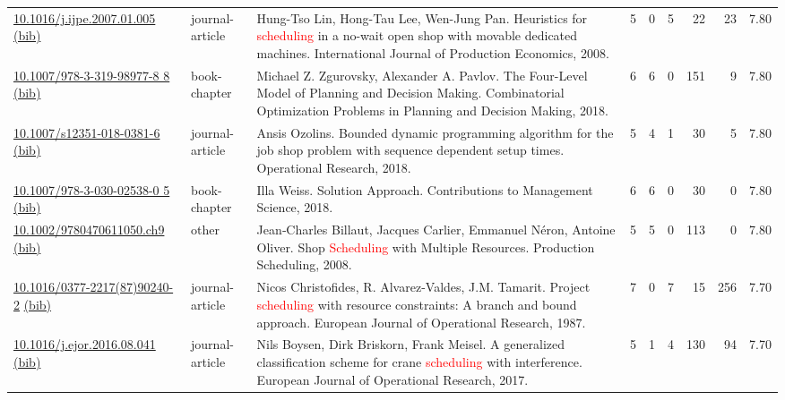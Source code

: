{\begin{longtable}{p{5cm}lp{11cm}rrrrrr}
\href{http://dx.doi.org/10.1016/j.ijpe.2007.01.005}{10.1016/j.ijpe.2007.01.005} \href{https://www.doi2bib.org/bib/10.1016/j.ijpe.2007.01.005}{(bib)} & journal-article & Hung-Tso Lin, Hong-Tau Lee, Wen-Jung Pan. Heuristics for \textcolor{red}{scheduling} in a no-wait open shop with movable dedicated machines. International Journal of Production Economics, 2008. & 5 & 0 & 5 & 22 & 23 &  7.80\\
\href{http://dx.doi.org/10.1007/978-3-319-98977-8_8}{10.1007/978-3-319-98977-8 8} \href{https://www.doi2bib.org/bib/10.1007/978-3-319-98977-8_8}{(bib)} & book-chapter & Michael Z. Zgurovsky, Alexander A. Pavlov. The Four-Level Model of Planning and Decision Making. Combinatorial Optimization Problems in Planning and Decision Making, 2018. & 6 & 6 & 0 & 151 & 9 &  7.80\\
\href{http://dx.doi.org/10.1007/s12351-018-0381-6}{10.1007/s12351-018-0381-6} \href{https://www.doi2bib.org/bib/10.1007/s12351-018-0381-6}{(bib)} & journal-article & Ansis Ozolins. Bounded dynamic programming algorithm for the job shop problem with sequence dependent setup times. Operational Research, 2018. & 5 & 4 & 1 & 30 & 5 &  7.80\\
\href{http://dx.doi.org/10.1007/978-3-030-02538-0_5}{10.1007/978-3-030-02538-0 5} \href{https://www.doi2bib.org/bib/10.1007/978-3-030-02538-0_5}{(bib)} & book-chapter & Illa Weiss. Solution Approach. Contributions to Management Science, 2018. & 6 & 6 & 0 & 30 & 0 &  7.80\\
\href{http://dx.doi.org/10.1002/9780470611050.ch9}{10.1002/9780470611050.ch9} \href{https://www.doi2bib.org/bib/10.1002/9780470611050.ch9}{(bib)} & other & Jean‐Charles Billaut, Jacques Carlier, Emmanuel Néron, Antoine Oliver. Shop \textcolor{red}{Scheduling} with Multiple Resources. Production Scheduling, 2008. & 5 & 5 & 0 & 113 & 0 &  7.80\\
\href{http://dx.doi.org/10.1016/0377-2217(87)90240-2}{10.1016/0377-2217(87)90240-2} \href{https://www.doi2bib.org/bib/10.1016/0377-2217(87)90240-2}{(bib)} & journal-article & Nicos Christofides, R. Alvarez-Valdes, J.M. Tamarit. Project \textcolor{red}{scheduling} with resource constraints: A branch and bound approach. European Journal of Operational Research, 1987. & 7 & 0 & 7 & 15 & 256 &  7.70\\
\href{http://dx.doi.org/10.1016/j.ejor.2016.08.041}{10.1016/j.ejor.2016.08.041} \href{https://www.doi2bib.org/bib/10.1016/j.ejor.2016.08.041}{(bib)} & journal-article & Nils Boysen, Dirk Briskorn, Frank Meisel. A generalized classification scheme for crane \textcolor{red}{scheduling} with interference. European Journal of Operational Research, 2017. & 5 & 1 & 4 & 130 & 94 &  7.70\\

\end{longtable}}
